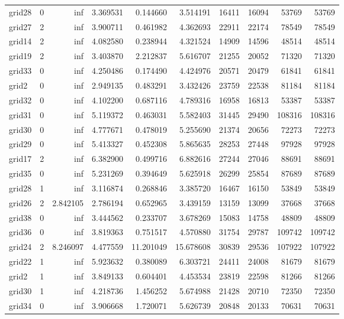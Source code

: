 \begin{longtable}{|l|r|r|r|r|r|r|r|r|r|}
grid28 & 0 & inf & 3.369531 & 0.144660 & 3.514191 & 16411 & 16094 & 53769 & 53769 \\
grid27 & 2 & inf & 3.900711 & 0.461982 & 4.362693 & 22911 & 22174 & 78549 & 78549 \\
grid14 & 2 & inf & 4.082580 & 0.238944 & 4.321524 & 14909 & 14596 & 48514 & 48514 \\
grid19 & 2 & inf & 3.403870 & 2.212837 & 5.616707 & 21255 & 20052 & 71320 & 71320 \\
grid33 & 0 & inf & 4.250486 & 0.174490 & 4.424976 & 20571 & 20479 & 61841 & 61841 \\
grid2 & 0 & inf & 2.949135 & 0.483291 & 3.432426 & 23759 & 22538 & 81184 & 81184 \\
grid32 & 0 & inf & 4.102200 & 0.687116 & 4.789316 & 16958 & 16813 & 53387 & 53387 \\
grid31 & 0 & inf & 5.119372 & 0.463031 & 5.582403 & 31445 & 29490 & 108316 & 108316 \\
grid30 & 0 & inf & 4.777671 & 0.478019 & 5.255690 & 21374 & 20656 & 72273 & 72273 \\
grid29 & 0 & inf & 5.413327 & 0.452308 & 5.865635 & 28253 & 27448 & 97928 & 97928 \\
grid17 & 2 & inf & 6.382900 & 0.499716 & 6.882616 & 27244 & 27046 & 88691 & 88691 \\
grid35 & 0 & inf & 5.231269 & 0.394649 & 5.625918 & 26299 & 25854 & 87689 & 87689 \\
grid28 & 1 & inf & 3.116874 & 0.268846 & 3.385720 & 16467 & 16150 & 53849 & 53849 \\
grid26 & 2 & 2.842105 & 2.786194 & 0.652965 & 3.439159 & 13159 & 13099 & 37668 & 37668 \\
grid38 & 0 & inf & 3.444562 & 0.233707 & 3.678269 & 15083 & 14758 & 48809 & 48809 \\
grid36 & 0 & inf & 3.819363 & 0.751517 & 4.570880 & 31754 & 29787 & 109742 & 109742 \\
grid24 & 2 & 8.246097 & 4.477559 & 11.201049 & 15.678608 & 30839 & 29536 & 107922 & 107922 \\
grid22 & 1 & inf & 5.923632 & 0.380089 & 6.303721 & 24411 & 24008 & 81679 & 81679 \\
grid2 & 1 & inf & 3.849133 & 0.604401 & 4.453534 & 23819 & 22598 & 81266 & 81266 \\
grid30 & 1 & inf & 4.218736 & 1.456252 & 5.674988 & 21428 & 20710 & 72350 & 72350 \\
grid34 & 0 & inf & 3.906668 & 1.720071 & 5.626739 & 20848 & 20133 & 70631 & 70631 \\

\end{longtable}
